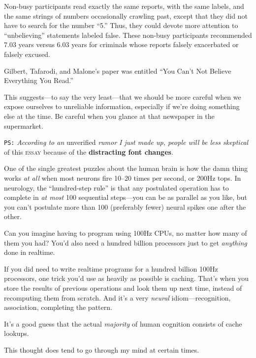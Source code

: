 {
 Non-busy participants read exactly the same reports, with the same
\textsf{labels}, and the same strings of numbers occasionally crawling past,
except that they did not have to search for the number
``5.'' Thus, they could devote more
attention to ``unbelieving''
statements \textsf{labeled false}. These non-busy participants recommended 7.03
years versus 6.03 years for criminals whose reports \textsf{falsely exacerbated}
or \textsf{falsely excused}.}

{
 Gilbert, Tafarodi, and Malone's paper was entitled
``You Can't Not Believe Everything You
Read.''}

{
 This suggests---to say the very least---that we should be more
careful when we expose ourselves to unreliable information, especially
if we're doing something else at the time. Be careful
when you glance at that newspaper in the supermarket.}

{
 \texttt{PS:} \textsl{According to an} \textsf{unverified} \emph{rumor I just made up, people will
be less skeptical} of this \textsc{essay} because of the \textbf{distracting font
changes}.}

\myendsectiontext


\bigskip


{
 One of the single greatest puzzles about the human brain is how
the damn thing works \textit{at all} when most neurons fire 10--20
times per second, or 200Hz tops. In neurology, the
``hundred-step rule'' is that any
postulated operation has to complete in \textit{at most} 100 sequential
steps---you can be as parallel as you like, but you
can't postulate more than 100 (preferably fewer) neural
spikes one after the other. }

{
 Can you imagine having to program using 100Hz CPUs, no matter how
many of them you had? You'd also need a hundred billion
processors just to get \textit{anything} done in realtime.}

{
 If you did need to write realtime programs for a hundred billion
100Hz processors, one trick you'd use as heavily as
possible is caching. That's when you store the results
of previous operations and look them up next time, instead of
recomputing them from scratch. And it's a very
\textit{neural} idiom---recognition, association, completing the
pattern.}

{
 It's a good guess that the actual
\textit{majority} of human cognition consists of cache lookups.}

{
 This thought does tend to go through my mind at certain times.}

